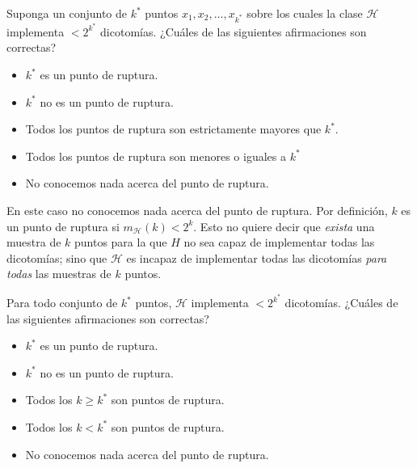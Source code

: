 \documentclass[a4paper, 11pt]{article}
\begin{document}
    \begin{ejercicio}
        Suponga un conjunto de $k^*$ puntos $x_1, x_2 , \dots , x_{k^*}$ sobre los cuales la clase $\mathcal{H}$ implementa $< 2^{k^*}$ dicotomías. ¿Cuáles de las siguientes afirmaciones son correctas?
        \begin{itemize}
            \item $k^*$ es un punto de ruptura.
            \item $k^*$ no es un punto de ruptura.
            \item Todos los puntos de ruptura son estrictamente mayores que $k^*$.
            \item Todos los puntos de ruptura son menores o iguales a $k^*$
            \item No conocemos nada acerca del punto de ruptura.
        \end{itemize}
    \end{ejercicio}

    \begin{solucion}
        En este caso no conocemos nada acerca del punto de ruptura. Por definición, $k$ es un punto de ruptura si $m_\mathcal{H}(k) < 2^k$. Esto no quiere decir que \emph{exista} una muestra de $k$ puntos para la que $H$ no sea capaz de implementar todas las dicotomías; sino que $\mathcal{H}$ es incapaz de implementar todas las dicotomías \emph{para todas} las muestras de $k$ puntos.
    \end{solucion}


    \begin{ejercicio}
        Para todo conjunto de $k^*$ puntos, $\mathcal{H}$ implementa $< 2^{k^*}$ dicotomías. ¿Cuáles de las siguientes afirmaciones son correctas?
        \begin{itemize}
            \item $k^*$ es un punto de ruptura.
            \item $k^*$ no es un punto de ruptura.
            \item Todos los $k \geq k^*$ son puntos de ruptura.
            \item Todos los $k < k^*$ son puntos de ruptura.
            \item No conocemos nada acerca del punto de ruptura.
        \end{itemize}
    \end{ejercicio}
\end{document}
